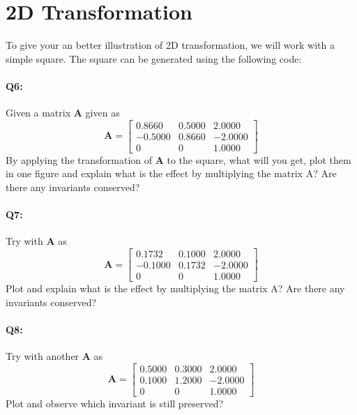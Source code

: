 \documentclass[a4paper]{article}
\begin{document}
\section{2D Transformation}
To give your an better illustration of 2D transformation, we will work with a simple square. The square can be generated using the following code:


\paragraph{Q6:} Given a matrix $\mathbf{A}$ given as
$$
\mathbf{A} = \left[\begin{matrix}
0.8660  &  0.5000     &    2.0000 \\ 
-0.5000  &  0.8660  &       -2.0000 \\
0 &  0 &     1.0000 \end{matrix}\right]
$$
By applying the transformation of $\mathbf{A}$ to the square, what will you get, plot them in one figure and explain what is the effect by multiplying the matrix A? Are there any invariants conserved?

\paragraph{Q7:} Try with $\mathbf{A}$ as 
$$
\mathbf{A} = \left[\begin{matrix}
0.1732  &  0.1000     &    2.0000 \\ 
-0.1000  &  0.1732  &       -2.0000 \\
0 &  0 &     1.0000 \end{matrix}\right]
$$
Plot and explain what is the effect by multiplying the matrix A? Are there any invariants conserved?

\paragraph{Q8:} Try with another $\mathbf{A}$ as
$$
\mathbf{A} = \left[\begin{matrix}
0.5000  &  0.3000     &    2.0000 \\ 
0.1000  &  1.2000  &       -2.0000 \\
0 &  0 &     1.0000 \end{matrix}\right]
$$
Plot and observe which invariant is still preserved?
\end{document}
